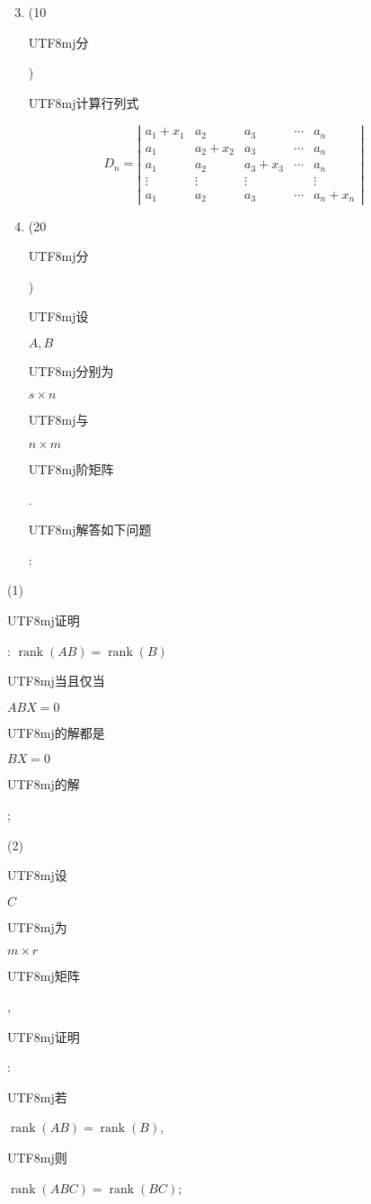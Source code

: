 \documentclass[10pt]{article}
\begin{document}
\begin{enumerate}
  \setcounter{enumi}{2}
  \item (10 \begin{CJK}{UTF8}{mj}分\end{CJK}) \begin{CJK}{UTF8}{mj}计算行列式\end{CJK}
\end{enumerate}
$$
D_{n}=\left|\begin{array}{ccccc}
a_{1}+x_{1} & a_{2} & a_{3} & \cdots & a_{n} \\
a_{1} & a_{2}+x_{2} & a_{3} & \cdots & a_{n} \\
a_{1} & a_{2} & a_{3}+x_{3} & \cdots & a_{n} \\
\vdots & \vdots & \vdots & & \vdots \\
a_{1} & a_{2} & a_{3} & \cdots & a_{n}+x_{n}
\end{array}\right|
$$

\begin{enumerate}
  \setcounter{enumi}{3}
  \item (20 \begin{CJK}{UTF8}{mj}分\end{CJK}) \begin{CJK}{UTF8}{mj}设\end{CJK} $A, B$ \begin{CJK}{UTF8}{mj}分别为\end{CJK} $s \times n$ \begin{CJK}{UTF8}{mj}与\end{CJK} $n \times m$ \begin{CJK}{UTF8}{mj}阶矩阵\end{CJK}. \begin{CJK}{UTF8}{mj}解答如下问题\end{CJK}:
\end{enumerate}
(1) \begin{CJK}{UTF8}{mj}证明\end{CJK}: $\operatorname{rank}(A B)=\operatorname{rank}(B)$ \begin{CJK}{UTF8}{mj}当且仅当\end{CJK} $A B X=0$ \begin{CJK}{UTF8}{mj}的解都是\end{CJK} $B X=0$ \begin{CJK}{UTF8}{mj}的解\end{CJK};

(2) \begin{CJK}{UTF8}{mj}设\end{CJK} $C$ \begin{CJK}{UTF8}{mj}为\end{CJK} $m \times r$ \begin{CJK}{UTF8}{mj}矩阵\end{CJK}, \begin{CJK}{UTF8}{mj}证明\end{CJK}: \begin{CJK}{UTF8}{mj}若\end{CJK} $\operatorname{rank}(A B)=\operatorname{rank}(B)$, \begin{CJK}{UTF8}{mj}则\end{CJK} $\operatorname{rank}(A B C)=\operatorname{rank}(B C)$;
\end{document}
